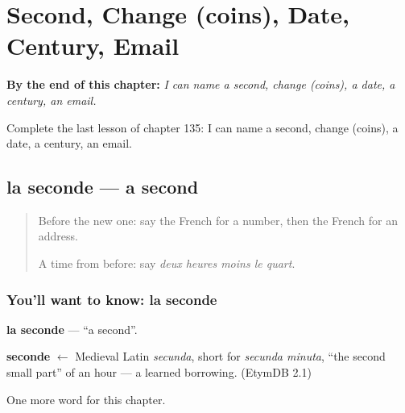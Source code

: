 
\chapter{Second, Change (coins), Date, Century, Email}
\label{ch:fr-second-change-coins-date-century-email}

\begin{chapteropening}
\textbf{By the end of this chapter:} \emph{I can name a second, change (coins), a date, a century, an email.}

Complete the last lesson of chapter 135: I can name a second, change (coins), a date, a century, an email.
\end{chapteropening}

\section[la seconde]{la seconde — a second}

\label{lesson:FR-C135-seconde}



\begin{quote}
Before the new one: say the French for a number, then the French for an address.

A time from before: say \emph{deux heures moins le quart}.
\end{quote}

\subsection*{You'll want to know: la seconde}
\textbf{la seconde} — \textquotedblleft{}a second\textquotedblright{}.

\begin{cousinweb}
\textbf{seconde} $\leftarrow$ Medieval Latin \emph{secunda}, short for \emph{secunda minuta}, \textquotedblleft{}the second small part\textquotedblright{} of an hour — a learned borrowing. (EtymDB 2.1)
\end{cousinweb}

\begin{grammarlens}[title={What you've built}]
One more word for this chapter.
\end{grammarlens}

